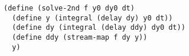 \documentclass[a4paper,12pt]{article}
\begin{document}
\begin{lstlisting}
(define (solve-2nd f y0 dy0 dt)
  (define y (integral (delay dy) y0 dt))
  (define dy (integral (delay ddy) dy0 dt))
  (define ddy (stream-map f dy y))
  y)
\end{lstlisting}
\end{document}
